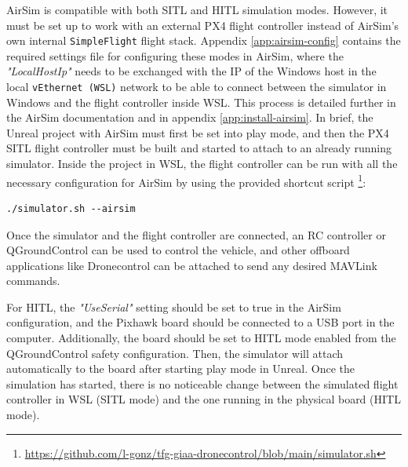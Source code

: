 AirSim is compatible with both SITL and HITL simulation modes.
However, it must be set up to work with an external PX4 flight controller instead of AirSim's own internal \texttt{SimpleFlight} flight stack.
Appendix \ref{app:airsim-config} contains the required settings file for configuring these modes in AirSim,
where the \emph{"LocalHostIp"} needs to be exchanged with the IP of the Windows host in the local \texttt{vEthernet (WSL)} network to be able to connect between the simulator in Windows and the flight controller inside WSL.
This process is detailed further in the AirSim documentation \cite{airsim-doc-wsl} and in appendix \ref{app:install-airsim}.
In brief, the Unreal project with AirSim must first be set into play mode, and then the PX4 SITL flight controller must be built and started to attach to an already running simulator.
Inside the project in WSL, the flight controller can be run with all the necessary configuration for AirSim by using the provided shortcut script \footnote{\url{https://github.com/l-gonz/tfg-giaa-dronecontrol/blob/main/simulator.sh}}:
\begin{verbatim}
./simulator.sh --airsim
\end{verbatim}
Once the simulator and the flight controller are connected, an RC controller or QGroundControl can be used to control the vehicle, and other offboard applications like Dronecontrol can be attached to send any desired MAVLink commands.

For HITL, the \emph{"UseSerial"} setting should be set to true in the AirSim configuration, and the Pixhawk board should be connected to a USB port in the computer.
Additionally, the board should be set to HITL mode enabled from the QGroundControl safety configuration.
Then, the simulator will attach automatically to the board after starting play mode in Unreal.
Once the simulation has started, there is no noticeable change between the simulated flight controller in WSL (SITL mode) and the one running in the physical board (HITL mode).
